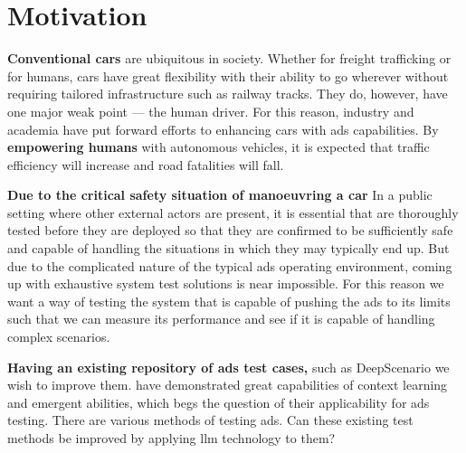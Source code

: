 \chapter{Motivation}

\textbf{Conventional cars} are ubiquitous in society. Whether for freight trafficking or for humans, cars have great flexibility with their ability to go wherever without requiring tailored infrastructure
such as railway tracks. They do, however, have one major weak point --- the human driver. For this
reason, industry and academia have put forward efforts to enhancing cars with \acrfull{ads}
capabilities.
By \textbf{empowering humans} with autonomous vehicles, it is expected that traffic efficiency will
increase and road fatalities will fall.

\textbf{Due to the critical safety situation of manoeuvring a car} In a public setting where other external
actors are present, it is essential that  are thoroughly tested before they are
deployed so that they are confirmed to be sufficiently safe and capable of handling the situations in which
they may typically end up.
But due to the complicated nature of the typical \acrshort{ads} operating environment, coming up with
exhaustive system test solutions is near impossible.
For this reason we want a way of testing the system that is capable of pushing the \acrlong{ads} to
its limits such that we can measure its performance and see if it is capable of
handling complex scenarios.

\textbf{Having an existing repository of \acrlong{ads} test cases,} such as
DeepScenario we wish to improve them. \textbf{} have demonstrated
great capabilities of context learning and emergent abilities, which begs
the question of their  applicability for \acrshort{ads} testing.  There are
various methods of testing  \acrlong{ads}. Can these existing test methods be
improved by applying \acrshort{llm} technology to them?

